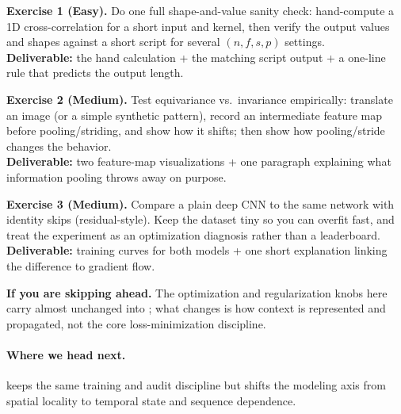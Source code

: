 \begin{tcolorbox}[summarybox, title={Exercises}]
\textbf{Exercise 1 (Easy).} Do one full shape-and-value sanity check: hand-compute a 1D cross-correlation for a short input and kernel, then verify the output values and shapes against a short script for several \((n,f,s,p)\) settings. \\
\textbf{Deliverable:} the hand calculation + the matching script output + a one-line rule that predicts the output length.

\smallskip
\textbf{Exercise 2 (Medium).} Test equivariance vs.\ invariance empirically: translate an image (or a simple synthetic pattern), record an intermediate feature map before pooling/striding, and show how it shifts; then show how pooling/stride changes the behavior. \\
\textbf{Deliverable:} two feature-map visualizations + one paragraph explaining what information pooling throws away on purpose.

\smallskip
\textbf{Exercise 3 (Medium).} Compare a plain deep CNN to the same network with identity skips (residual-style). Keep the dataset tiny so you can overfit fast, and treat the experiment as an optimization diagnosis rather than a leaderboard. \\
\textbf{Deliverable:} training curves for both models + one short explanation linking the difference to gradient flow.

\par\medskip
\noindent\textbf{If you are skipping ahead.} The optimization and regularization knobs here carry almost unchanged into ; what changes is how context is represented and propagated, not the core loss-minimization discipline.
\end{tcolorbox}

\medskip
\paragraph{Where we head next.}  keeps the same training and audit discipline but shifts the modeling axis from spatial locality to temporal state and sequence dependence.
